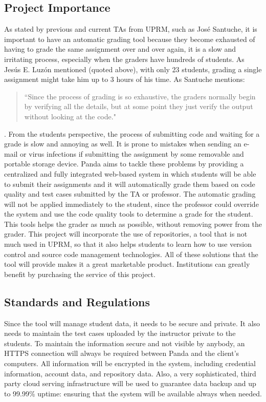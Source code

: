 \subsection{Project Importance}

As stated by previous and current TAs from UPRM, such as José
Santuche, it is important to have an automatic grading tool because they become
exhausted of having to grade the same assignment over and over again, it is a
slow and irritating process, especially when the graders have hundreds of
students. As Jesús E. Luzón mentioned (quoted above), with only 23 students,
grading a single assignment might take him up to 3 hours of his time. As
Santuche mentions: \begin{quote} ``Since the process of grading is so exhaustive,
the graders normally begin by verifying all the details, but at some point they
just verify the output without looking at the code." \end{quote}. From the
students perspective, the process of submitting code and waiting for a grade is
slow and annoying as well. It is prone to mistakes when sending an e-mail or virus infections if submitting the assignment by some removable and portable storage device. Panda aims to tackle these problems by providing a
centralized and fully integrated web-based system in which students will be able
to submit their assignments and it will automatically grade them based on code
quality and test cases submitted by the TA or professor. The automatic grading
will not be applied immediately to the student, since the professor could
override the system and use the code quality tools to determine a grade for the
student. This tools helps the grader as much as possible, without removing power
from the grader. This project will incorporate the use of repositories, a tool
that is not much used in UPRM, so that it also helps students to learn
how to use version control and source code management technologies. All of
these solutions that the tool will provide makes it a great marketable product.
Institutions can greatly benefit by purchasing the service of this project.

\subsection{Standards and Regulations}

Since the tool will manage student data, it needs to be secure and private. It
also needs to maintain the test cases uploaded by the instructor private to the
students. To maintain the information secure and not visible by anybody, an
HTTPS connection will always be required between Panda and the client's
computers. All information will be encrypted in the system, including credential
information, account data, and repository data. Also, a very sophisticated,
third party cloud serving infrastructure will be used to guarantee data backup
and up to 99.99\% uptime: ensuring that the system will be available always when
needed.
